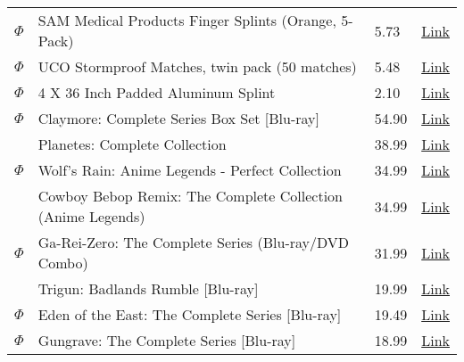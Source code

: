 \documentclass[12pt]{article}
\begin{document}
\begin{longtable}{ | p{1.3cm} | p{12cm} | l | l |}
$\Phi$ & SAM Medical Products Finger Splints (Orange, 5-Pack) & 5.73 & \href{http://www.amazon.com/SAM-Medical-Products-Finger-Splints/dp/B001UVOG2G/ref=sr_1_1?ie=UTF8&qid=1324835601&sr=8-1}{Link} \\
$\Phi$ & UCO Stormproof Matches, twin pack (50 matches) & 5.48 & \href{http://www.amazon.com/UCO-Stormproof-Matches-twin-matches/dp/B00345Q1WE/ref=pd_sim_sbs_sg_1}{Link} \\
$\Phi$ & 4 X 36 Inch Padded Aluminum Splint & 2.10 & \href{http://www.amazon.com/36-Inch-Padded-Aluminum-Splint/dp/B00124QUH0/ref=sr_1_1?s=sporting-goods&ie=UTF8&qid=1324835616&sr=1-1}{Link} \\

\hline
\hline

$\Phi$ & Claymore: Complete Series Box Set [Blu-ray] & 54.90 & \href{http://www.amazon.com/Claymore-Complete-Box-Set-Blu-ray/dp/B002Y0KR66/ref=wl_it_dp_o_npd?ie=UTF8&coliid=I1CB6CCI6ECULD&colid=2CEAJ0SZHT29K}{Link} \\
& Planetes: Complete Collection & 38.99 & \href{http://www.amazon.com/Planetes-Complete-Collection-Nao-Nagasawa/dp/B000HT3876/ref=wl_it_dp_o_npd?ie=UTF8&coliid=I2E3NIZ8K55X27&colid=2CEAJ0SZHT29K}{Link} \\
$\Phi$ & Wolf's Rain: Anime Legends - Perfect Collection & 34.99 & \href{http://www.amazon.com/Wolfs-Rain-Legends-Perfect-Collection/dp/B001K98MLO/ref=sr_1_1?s=movies-tv&ie=UTF8&qid=1322589189&sr=1-1}{Link} \\
& Cowboy Bebop Remix: The Complete Collection (Anime Legends) & 34.99 & \href{http://www.amazon.com/Cowboy-Bebop-Remix-Complete-Collection/dp/B00102FF7U/ref=pd_bxgy_mov_text_c}{Link} \\
$\Phi$ & Ga-Rei-Zero: The Complete Series (Blu-ray/DVD Combo) & 31.99 & \href{http://www.amazon.com/Ga-Rei-Zero-Complete-Blu-ray-DVD-Combo/dp/B004DMIIT6/ref=pd_sim_mov_19}{Link} \\
& Trigun: Badlands Rumble [Blu-ray] & 19.99 & \href{http://www.amazon.com/Trigun-Badlands-Blu-ray-Luci-Christian/dp/B00576U9JE/ref=pd_bxgy_mov_text_c}{Link} \\
$\Phi$ & Eden of the East: The Complete Series [Blu-ray] & 19.49 & \href{http://www.amazon.com/Eden-East-Complete-Jason-Liebrecht/dp/B003SPDS8A/ref=wl_it_dp_o_pd_T1?ie=UTF8&coliid=I3CCTEO78VNIHJ&colid=2CEAJ0SZHT29K}{Link} \\
$\Phi$ & Gungrave: The Complete Series [Blu-ray] & 18.99 & \href{http://www.amazon.com/Gungrave-Complete-Blu-ray-Ron-Allen/dp/B004TP55PM/ref=sr_1_1?s=movies-tv&ie=UTF8&qid=1322588552&sr=1-1}{Link} \\

\end{longtable}
\end{document}
